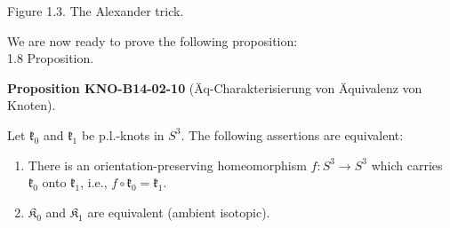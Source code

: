 \documentclass[10pt, letterpaper]{article}
\newcommand{\CustomHeading}[3]{%
  \par\medskip\noindent%
  \textbf{#1 #2} \textnormal{(#3)}.\enskip%
}
\newenvironment{PROP}[2]{\begin{unitbox}\CustomHeading{Proposition}{#1}{#2}}{\end{unitbox}}
\begin{document}
Figure 1.3. The Alexander trick.

We are now ready to prove the following proposition:\\


1.8 Proposition. 

\begin{PROP}{KNO-B14-02-10}{Äq-Charakterisierung von Äquivalenz von Knoten}
Let $\mathfrak{k}_{0}$ and $\mathfrak{k}_{1}$ be p.l.-knots in $S^{3}$. The following assertions are equivalent:
\begin{enumerate}
  \item There is an orientation-preserving homeomorphism \( f: S^{3} \rightarrow S^{3} \) which carries \( \mathfrak{k}_{0} \) onto \( \mathfrak{k}_{1} \), i.e., \( f \circ \mathfrak{k}_{0} = \mathfrak{k}_{1} \).
  \item \( \mathfrak{K}_{0} \) and \( \mathfrak{K}_{1} \) are equivalent (ambient isotopic).
\end{enumerate}
\end{PROP}
\end{document}
